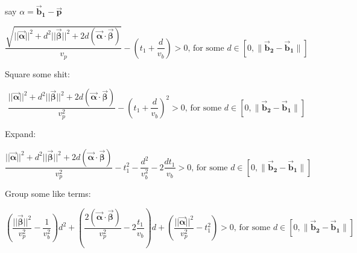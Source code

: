 \documentclass[11pt]{article} %
\begin{document}
say $\alpha = \bm{\vec{b}_1} - \bm{\vec{p}}$

$$ \frac{ \sqrt{ ||\bm{\vec{\alpha}}||^2 + d^2||\bm{\vec{\beta}}||^2 + 2d(\bm{\vec{\alpha}} \cdot \bm{\vec{\beta}}) }} {v_p} - \left(t_1 + \frac{d}{v_b}\right) > 0 \mbox{, for some } d \in [0,  \|\bm{\vec{b}_2} - \bm{\vec{b}_1}\|] $$

Square some shit:

$$ \frac{ ||\bm{\vec{\alpha}}||^2 + d^2||\bm{\vec{\beta}}||^2 + 2d(\bm{\vec{\alpha}} \cdot \bm{\vec{\beta}}) } {v_p^2} - \left(t_1 + \frac{d}{v_b}\right)^2 > 0 \mbox{, for some } d \in [0,  \|\bm{\vec{b}_2} - \bm{\vec{b}_1}\|] $$

Expand:

$$ \frac{ ||\bm{\vec{\alpha}}||^2 + d^2||\bm{\vec{\beta}}||^2 + 2d(\bm{\vec{\alpha}} \cdot \bm{\vec{\beta}}) } {v_p^2} - t_1^2 - \frac{d^2}{v_b^2} - 2 \frac{dt_1}{v_b} > 0 \mbox{, for some } d \in [0,  \|\bm{\vec{b}_2} - \bm{\vec{b}_1}\|] $$

Group some like terms:

$$ \left(\frac{||\bm{\vec{\beta}}||^2}{v_p^2}  - \frac{1}{v_b^2}\right) d^2 + 
\left(\frac{2(\bm{\vec{\alpha}} \cdot \bm{\vec{\beta}}) } {v_p^2} - 2 \frac{t_1}{v_b}\right) d +
\left(\frac{ ||\bm{\vec{\alpha}}||^2}{v_p^2} - t_1^2 \right)
  > 0 \mbox{, for some } d \in [0,  \|\bm{\vec{b}_2} - \bm{\vec{b}_1}\|] $$
\end{document}
